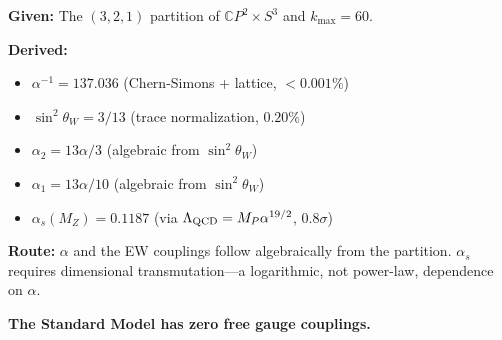 \begin{tcolorbox}[colback=blue!5!white, colframe=blue!60!black,
  title=Summary: All Gauge Couplings from Topology]

\textbf{Given:} The $(3,2,1)$ partition of $\mathbb{C}P^2 \times S^3$ and $k_{\max} = 60$.

\textbf{Derived:}
\begin{itemize}
\item $\alpha^{-1} = 137.036$ (Chern-Simons + lattice, $<0.001\%$)
\item $\sin^2\theta_W = 3/13$ (trace normalization, $0.20\%$)
\item $\alpha_2 = 13\alpha/3$ (algebraic from $\sin^2\theta_W$)
\item $\alpha_1 = 13\alpha/10$ (algebraic from $\sin^2\theta_W$)
\item $\alpha_s(M_Z) = 0.1187$ (via $\Lambda_{\rm QCD} = M_P\alpha^{19/2}$, $0.8\sigma$)
\end{itemize}

\textbf{Route:} $\alpha$ and the EW couplings follow algebraically from the partition.
$\alpha_s$ requires dimensional transmutation---a logarithmic, not power-law, dependence on $\alpha$.

\textbf{The Standard Model has zero free gauge couplings.}

\end{tcolorbox}


